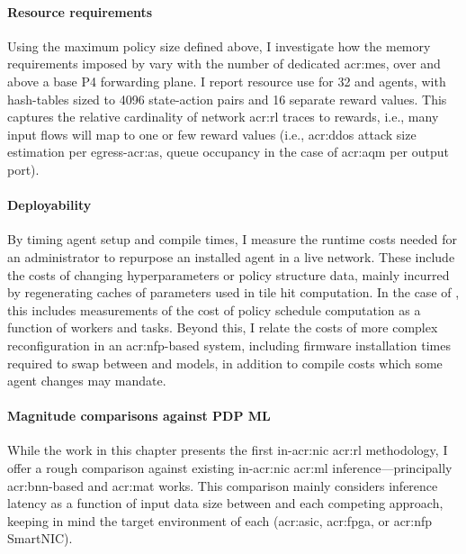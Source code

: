 \paragraph{Resource requirements}
Using the maximum policy size defined above, I investigate how the memory requirements imposed by \approachshort{} vary with the number of dedicated \glspl{acr:me}, over and above a base P4 forwarding plane.
I report resource use for \qty{32}{\bit} \Indfw{} and \Coopfw{} agents, with hash-tables sized to \num{4096} state-action pairs and \num{16} separate reward values.
This captures the relative cardinality of network \gls{acr:rl} traces to rewards, i.e., many input flows will map to one or few reward values (i.e., \gls{acr:ddos} attack size estimation per egress-\gls{acr:as}, queue occupancy in the case of \gls{acr:aqm} per output port).


\paragraph{Deployability}
By timing agent setup and compile times, I measure the runtime costs needed for an administrator to repurpose an installed agent in a live network.
These include the costs of changing hyperparameters or policy structure data, mainly incurred by regenerating caches of parameters used in tile hit computation.
In the case of \coopfw{}, this includes measurements of the cost of policy schedule computation as a function of workers and tasks.
Beyond this, I relate the costs of more complex reconfiguration in an \gls{acr:nfp}-based system, including firmware installation times required to swap between \coopfw{} and \indfw{} models, in addition to compile costs which some agent changes may mandate.

\paragraph{Magnitude comparisons against PDP ML}
While the work in this chapter presents the first in-\gls{acr:nic} \gls{acr:rl} methodology, I offer a rough comparison against existing in-\gls{acr:nic} \gls{acr:ml} inference---principally \gls{acr:bnn}-based and \gls{acr:mat} works.
This comparison mainly considers inference latency as a function of input data size between \approachshort{} and each competing approach, keeping in mind the target environment of each (\gls{acr:asic}, \gls{acr:fpga}, or \gls{acr:nfp} SmartNIC).
